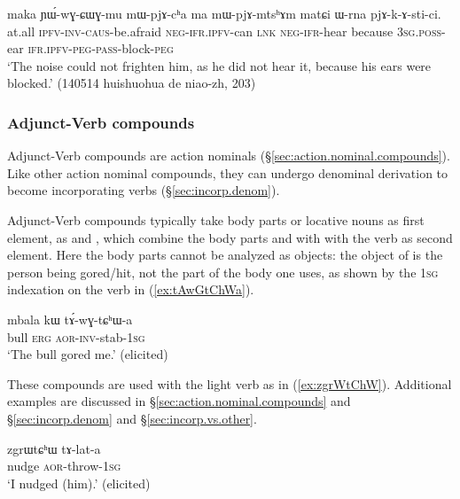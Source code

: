 \begin{exe}
\ex \label{ex:pjAkAstici}
\gll maka ɲɯ́-wɣ-ɕɯɣ-mu mɯ-pjɤ-cʰa ma mɯ-pjɤ-mtsʰɤm matɕi ɯ-rna pjɤ-k-ɤ-sti-ci. \\
at.all \textsc{ipfv}-\textsc{inv}-\textsc{caus}-be.afraid \textsc{neg}-\textsc{ifr}.\textsc{ipfv}-can \textsc{lnk} \textsc{neg}-\textsc{ifr}-hear because \textsc{3sg}.\textsc{poss}-ear \textsc{ifr}.\textsc{ipfv}-\textsc{peg}-\textsc{pass}-block-\textsc{peg} \\
\glt `The noise could not frighten him, as he did not hear it, because his ears were blocked.' (140514 huishuohua de niao-zh, 203)
\end{exe}

\subsubsection{Adjunct-Verb compounds} \label{sec:adjunct.verb.compounds}
Adjunct-Verb compounds are action nominals (§\ref{sec:action.nominal.compounds}). Like other action nominal compounds, they can undergo denominal derivation to become incorporating verbs (§\ref{sec:incorp.denom}).  

Adjunct-Verb compounds typically take body parts or locative nouns as first element, as  and , which combine the body parts   and   with with the verb  as second element. Here the body parts cannot be analyzed as objects: the object of  is the person being gored/hit, not the part of the body one uses, as shown by the \textsc{1sg} indexation on the verb in (\ref{ex:tAwGtChWa}).

\begin{exe}
\ex \label{ex:tAwGtChWa}
\gll mbala kɯ tɤ́-wɣ-tɕʰɯ-a \\
bull \textsc{erg} \textsc{aor}-\textsc{inv}-stab-\textsc{1sg} \\
\glt `The bull gored me.' (elicited)
\end{exe}

These compounds are used with the light verb  as in (\ref{ex:zgrWtChW}).  Additional examples are discussed in §\ref{sec:action.nominal.compounds} and §\ref{sec:incorp.denom} and §\ref{sec:incorp.vs.other}.


\begin{exe}
\ex \label{ex:zgrWtChW}
\gll zgrɯtɕʰɯ tɤ-lat-a \\
nudge \textsc{aor}-throw-\textsc{1sg} \\
\glt `I nudged (him).' (elicited)
\end{exe}

